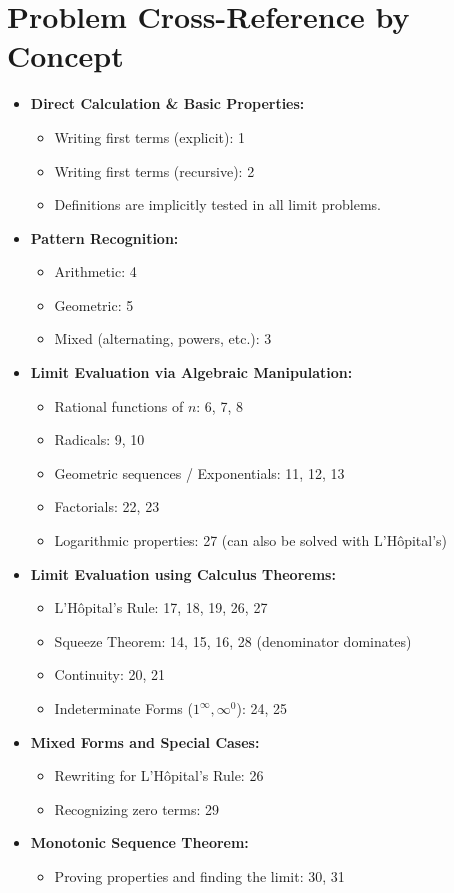 \documentclass{article}
\begin{document}
\newpage
\section*{Problem Cross-Reference by Concept}
\begin{itemize}
    \item \textbf{Direct Calculation \& Basic Properties:}
    \begin{itemize}
        \item Writing first terms (explicit): 1
        \item Writing first terms (recursive): 2
        \item Definitions are implicitly tested in all limit problems.
    \end{itemize}
    \item \textbf{Pattern Recognition:}
    \begin{itemize}
        \item Arithmetic: 4
        \item Geometric: 5
        \item Mixed (alternating, powers, etc.): 3
    \end{itemize}
    \item \textbf{Limit Evaluation via Algebraic Manipulation:}
    \begin{itemize}
        \item Rational functions of $n$: 6, 7, 8
        \item Radicals: 9, 10
        \item Geometric sequences / Exponentials: 11, 12, 13
        \item Factorials: 22, 23
        \item Logarithmic properties: 27 (can also be solved with L'H\^opital's)
    \end{itemize}
    \item \textbf{Limit Evaluation using Calculus Theorems:}
    \begin{itemize}
        \item L'H\^opital's Rule: 17, 18, 19, 26, 27
        \item Squeeze Theorem: 14, 15, 16, 28 (denominator dominates)
        \item Continuity: 20, 21
        \item Indeterminate Forms ($1^\infty, \infty^0$): 24, 25
    \end{itemize}
    \item \textbf{Mixed Forms and Special Cases:}
    \begin{itemize}
        \item Rewriting for L'H\^opital's Rule: 26
        \item Recognizing zero terms: 29
    \end{itemize}
    \item \textbf{Monotonic Sequence Theorem:}
    \begin{itemize}
        \item Proving properties and finding the limit: 30, 31
    \end{itemize}
\end{itemize}
\end{document}
